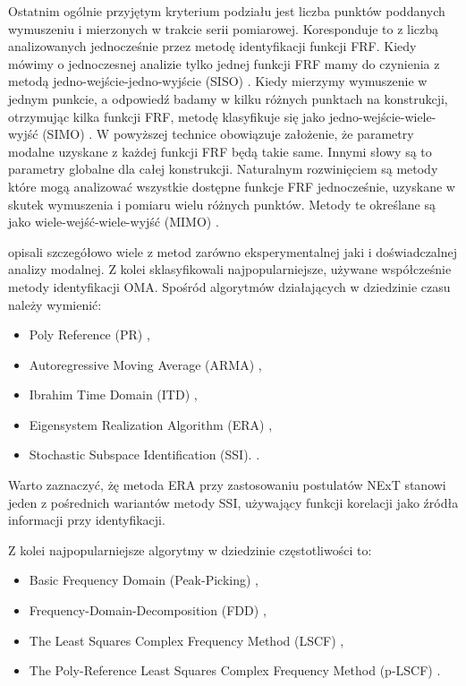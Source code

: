 Ostatnim ogólnie przyjętym kryterium podziału jest liczba punktów poddanych wymuszeniu i mierzonych w trakcie serii pomiarowej. Koresponduje to z liczbą analizowanych jednocześnie przez metodę identyfikacji funkcji FRF. Kiedy mówimy o jednoczesnej analizie tylko jednej funkcji FRF mamy do czynienia z metodą jedno-wejście-jedno-wyjście (SISO) . Kiedy mierzymy wymuszenie w jednym punkcie, a odpowiedź badamy w kilku różnych punktach na konstrukcji, otrzymując kilka funkcji FRF, metodę klasyfikuje się jako jedno-wejście-wiele-wyjść (SIMO) . W powyższej technice obowiązuje założenie, że parametry modalne uzyskane z każdej funkcji FRF będą takie same. Innymi słowy są to parametry globalne dla całej konstrukcji. Naturalnym rozwinięciem są metody które mogą analizować wszystkie dostępne funkcje FRF jednocześnie, uzyskane w skutek wymuszenia i pomiaru wielu różnych punktów. Metody te określane są jako wiele-wejść-wiele-wyjść (MIMO) .

\cite{Maia1997} opisali szczegółowo wiele z metod zarówno eksperymentalnej jaki i doświadczalnej analizy modalnej. Z kolei \cite{Brincker2015} sklasyfikowali najpopularniejsze, używane współcześnie metody identyfikacji OMA. Spośród algorytmów działających w dziedzinie czasu należy wymienić:
\begin{itemize}[noitemsep]
	\item Poly Reference (PR) \parencite{Norton2009,Vold1982},
	\item Autoregressive Moving Average (ARMA) \parencite{Shi1987,Huang2000,Giorcelli1994},
	\item Ibrahim Time Domain (ITD) \parencite{Ibrahim1983,Pappa1985a},
	\item Eigensystem Realization Algorithm (ERA) \parencite{Juang1985,Pappa1985,Juang1988},
	\item Stochastic Subspace Identification (SSI). \parencite{VanOverschee1996,Peeters1999a,Peeters2000}. 
\end{itemize}

Warto zaznaczyć, żę metoda ERA przy zastosowaniu postulatów NExT stanowi jeden z pośrednich wariantów metody SSI, używający funkcji korelacji jako źródła informacji przy identyfikacji.

Z kolei najpopularniejsze algorytmy w dziedzinie częstotliwości to:
\begin{itemize}[noitemsep]
	\item Basic Frequency Domain (Peak-Picking) \parencite{Felber1994},
	\item Frequency-Domain-Decomposition (FDD) \parencite{Brincker2000,Brincker2001a,Brincker2001b},
	\item The Least Squares Complex Frequency Method (LSCF) \parencite{Verboven2005},
	\item The Poly-Reference Least Squares Complex Frequency Method (p-LSCF) \parencite{Peeters2005}.
\end{itemize}



